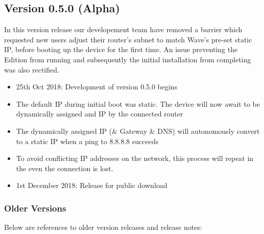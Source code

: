 \documentclass[letterpaper,10pt,english]{sphinxmanual}
\begin{document}
\subsection{Version 0.5.0 (Alpha)}
\label{\detokenize{releasenotes:version-0-5-0-alpha}}
In this version release our developement team have removed a barrier which requested new users adjust their router’s subnet to match Wave’s pre-set static IP, before booting up the device for the first time. An issue preventing the Edition from running and subsequently the initial installation from completing was also rectified.
\begin{itemize}
\item {} 
25th Oct 2018: Development of version 0.5.0 begins

\item {} 
The default IP during initial boot was static. The device will now await to be dynamically assigned and IP by the connected router

\item {} 
The dynamically assigned IP (\& Gateway \& DNS) will autonomously convert to a static IP when a ping to 8.8.8.8 succeeds

\item {} 
To avoid conflicting IP addresses on the network, this process will repeat in the even the connection is lost.

\item {} 
1st December 2018: Release for public download

\end{itemize}


\subsubsection{Older Versions}
\label{\detokenize{releasenotes:older-versions}}
Below are references to older version releases and release notes:
\end{document}
